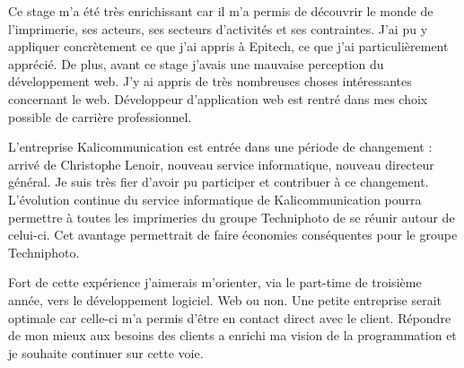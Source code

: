 \vspace*{2cm}
Ce stage m'a été très enrichissant car il m'a permis de découvrir le monde de l'imprimerie, ses acteurs, ses secteurs d'activités et ses contraintes. J'ai pu y appliquer concrètement ce que j'ai appris à Epitech, ce que j'ai particulièrement apprécié. De plus, avant ce stage j'avais une mauvaise perception du développement web. J'y ai appris de très nombreuses choses intéressantes concernant le web. Développeur d'application web est rentré dans mes choix possible de carrière professionnel.\newline

L'entreprise Kalicommunication est entrée dans une période de changement : arrivé de Christophe Lenoir, nouveau service informatique, nouveau directeur général. Je suis très fier d'avoir pu participer et contribuer à ce changement. L'évolution continue du service informatique de Kalicommunication pourra permettre à toutes les imprimeries du groupe Techniphoto de se réunir autour de celui-ci. Cet avantage permettrait de faire économies conséquentes pour le groupe Techniphoto.\newline

Fort de cette expérience j'aimerais m'orienter, via le part-time de troisième année, vers le développement logiciel. Web ou non. Une petite entreprise serait optimale car celle-ci m'a permis d'être en contact direct avec le client. Répondre de mon mieux aux besoins des clients a enrichi ma vision de la programmation et je souhaite continuer sur cette voie.